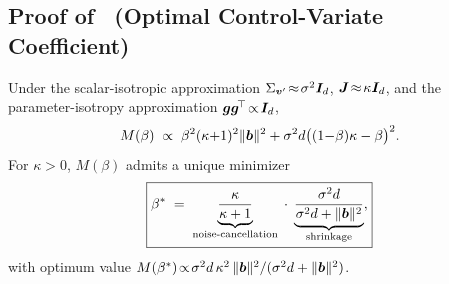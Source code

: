 \begin{appendices}
    \subsection{Proof of~ (Optimal Control-Variate Coefficient)}

    \begin{theorem}
        Under the scalar-isotropic approximation $\Sigma_{{\bm{v}}^{\prime}}\!\approx\!\sigma^{2}{\bm{I}}_{d}$, ${\bm{J}}\!\approx\!\kappa{\bm{I}}_{d}$, and the parameter-isotropy approximation ${\bm{g}}{\bm{g}}^{\!\top}\!\propto\!{\bm{I}}_{d}$,
        \begin{equation*}
            M(\beta) \;\propto\; \beta^{2}(\kappa{+}1)^{2}\|{\bm{b}}\|^{2} + \sigma^{2}d\bigl((1{-}\beta)\kappa - \beta\bigr)^{2}.
        \end{equation*}
        For $\kappa\!>\!0$, $M(\beta)$ admits a unique minimizer
        \begin{equation*}
            \boxed{
                \beta^{\ast} \;=\; \underbrace{\frac{\kappa}{\kappa+1}}_{\text{noise-cancellation}}\;\cdot\;\underbrace{\frac{\sigma^{2}d}{\sigma^{2}d + \|{\bm{b}}\|^{2}}}_{\text{shrinkage}},
            }
        \end{equation*}
        with optimum value $M(\beta^{\ast})\!\propto\!\sigma^{2}d\,\kappa^{2}\,\|{\bm{b}}\|^{2}/(\sigma^{2}d+\|{\bm{b}}\|^{2})$.
    \end{theorem}


\end{appendices}
